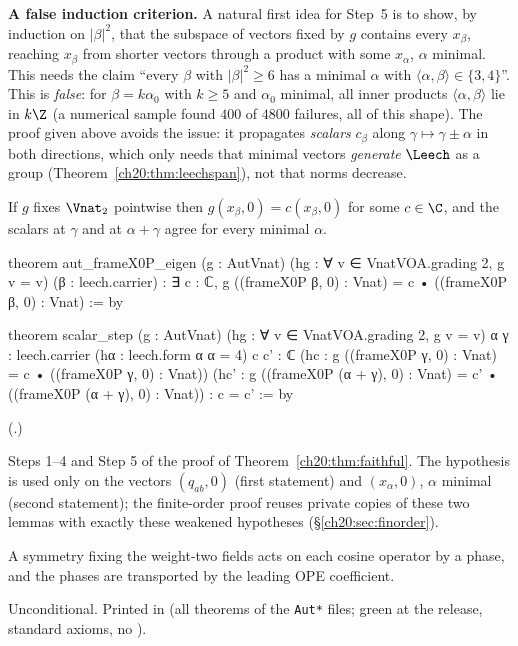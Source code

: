 \begin{warning}
\textbf{A false induction criterion.}  A natural first idea for Step~5 is to show, by
induction on $|\beta|^2$, that the subspace of vectors fixed by $g$ contains every $x_\beta$, reaching $x_\beta$ from shorter
vectors through a product with some $x_\alpha$, $\alpha$ minimal.  This needs
the claim ``every $\beta$ with $|\beta|^2\ge6$ has a minimal $\alpha$ with $\langle\alpha,\beta\rangle\in\{3,4\}$''.  This is
\emph{false}: for $\beta=k\alpha_0$ with $k\ge5$ and $\alpha_0$ minimal, all inner products $\langle\alpha,\beta\rangle$ lie in
$k\Z$ (a numerical sample found $400$ of $4800$ failures, all of this shape).  The proof given above avoids the issue: it
propagates \emph{scalars} $c_\beta$ along $\gamma\mapsto\gamma\pm\alpha$ in both directions, which only needs that minimal
vectors \emph{generate} $\Leech$ as a group (Theorem~\ref{ch20:thm:leechspan}), not that norms decrease.
\end{warning}

\begin{lemma}\label{ch20:lem:scalars}
If $g$ fixes $\Vnat_2$ pointwise then $g(x_\beta,0)=c(x_\beta,0)$ for some $c\in\C$, and the scalars at $\gamma$ and at
$\alpha+\gamma$ agree for every minimal $\alpha$.
\end{lemma}
\begin{leancode}
theorem aut_frameX0P_eigen (g : AutVnat) (hg : ∀ v ∈ VnatVOA.grading 2, g v = v)
    (β : leech.carrier) :
    ∃ c : ℂ, g ((frameX0P β, 0) : Vnat) = c • ((frameX0P β, 0) : Vnat) := by

theorem scalar_step (g : AutVnat) (hg : ∀ v ∈ VnatVOA.grading 2, g v = v)
    {α γ : leech.carrier} (hα : leech.form α α = 4) {c c' : ℂ}
    (hc : g ((frameX0P γ, 0) : Vnat) = c • ((frameX0P γ, 0) : Vnat))
    (hc' : g ((frameX0P (α + γ), 0) : Vnat) = c' • ((frameX0P (α + γ), 0) : Vnat)) : c = c' := by
\end{leancode}
(.)
\begin{dictionary}
Steps 1--4 and Step 5 of the proof of Theorem~\ref{ch20:thm:faithful}.  The hypothesis  is used only on the
vectors $(q_{ab},0)$ (first statement) and $(x_\alpha,0)$, $\alpha$ minimal (second statement); the finite-order proof
reuses private copies of these two lemmas with exactly these weakened hypotheses (\S\ref{ch20:sec:finorder}).
\end{dictionary}
\begin{physics}
A symmetry fixing the weight-two fields acts on each cosine operator by a phase, and the phases are transported by the
leading OPE coefficient.
\end{physics}
\begin{status}
Unconditional.  Printed in  (all theorems of the \texttt{Aut*} files; green at the release, standard axioms, no ).
\end{status}

